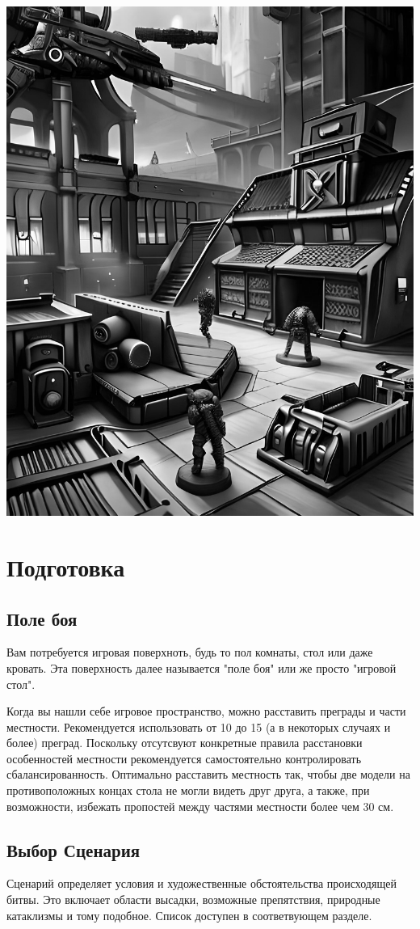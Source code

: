 \documentclass[twocolumn]{article}
\newcommand{\ssec}[1]{\section{#1}\label{sec:#1}}
\newcommand{\subsec}[1]{\subsection{#1}\label{subsec:#1}}
\begin{document}
\vspace{24pt}
\includegraphics[width=0.9\columnwidth]{Strategy}

\newpage

\ssec{Подготовка}
\subsec{Поле боя}
Вам потребуется игровая поверхноть, будь то пол комнаты, стол или даже кровать. Эта поверхность далее называется "поле боя" или же просто "игровой стол".

Когда вы нашли себе игровое пространство, можно расставить преграды и части местности. Рекомендуется использовать от 10 до 15 (а в некоторых случаях и более) преград. Поскольку отсутсвуют конкретные правила расстановки особенностей местности рекомендуется самостоятельно контролировать сбалансированность. Оптимально расставить местность так, чтобы две модели на противоположных концах стола не могли видеть друг друга, а также, при возможности, избежать пропостей между частями местности более чем 30 см.

\subsec{Выбор Сценария}
Сценарий определяет условия и художественные обстоятельства происходящей битвы. Это включает области высадки, возможные препятствия, природные катаклизмы и тому подобное. Список доступен в соответвующем разделе.
\end{document}
